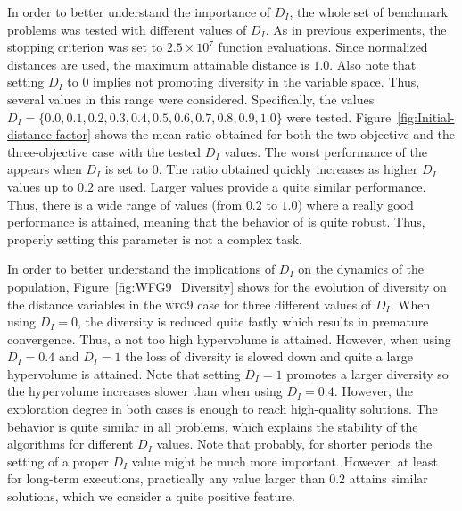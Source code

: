 
In order to better understand the importance of $D_I$, the whole set of benchmark problems was tested with different values
of $D_I$.
%
As in previous experiments, the stopping criterion was set to $2.5 \times 10^7$ function evaluations.
%
Since normalized distances are used, the maximum attainable distance is $1.0$.
%
Also note that setting $D_I$ to $0$ implies not promoting diversity in the variable space.
%
Thus, several values in this range were considered.
%
Specifically, the values $D_I = \{0.0, 0.1, 0.2, 0.3, 0.4, 0.5, 0.6, 0.7, 0.8, 0.9, 1.0\}$ were tested.
%
Figure~\ref{fig:Initial-distance-factor} shows the mean \HV{} ratio obtained for both the two-objective 
and the three-objective case with the tested $D_I$ values.
%
The worst performance of the \AVSDMOEAD{} appears when $D_I$ is set to $0$.
%
The \HV{} ratio obtained quickly increases as higher $D_I$ values up to $0.2$ are used.
%
Larger values provide a quite similar performance.
%
Thus, there is a wide range of values (from $0.2$ to $1.0$) where a really good performance is attained, 
meaning that the behavior of \AVSDMOEAD{} is quite robust.
%
Thus, properly setting this parameter is not a complex task.

In order to better understand the implications of $D_I$ on the dynamics of the population, Figure~\ref{fig:WFG9_Diversity}
shows for \AVSDMOEAD{} the evolution of diversity on the distance variables in the \textsc{wfg9} case for three different values of $D_I$.
%
When using $D_I = 0$, the diversity is reduced quite fastly which results in premature convergence.
%
Thus, a not too high hypervolume is attained.
%
However, when using $D_I = 0.4$ and $D_I = 1$ the loss of diversity is slowed down and quite a large hypervolume
is attained.
%
Note that setting $D_I = 1$ promotes a larger diversity so the hypervolume increases slower than when using
$D_I = 0.4$.
%
However, the exploration degree in both cases is enough to reach high-quality solutions.
%
The behavior is quite similar in all problems, which explains the stability of the algorithms for
different $D_I$ values.
%
Note that probably, for shorter periods the setting of a proper $D_I$ value might be much more important.
%
However, at least for long-term executions, practically any value larger than $0.2$ attains similar solutions,
which we consider a quite positive feature.


